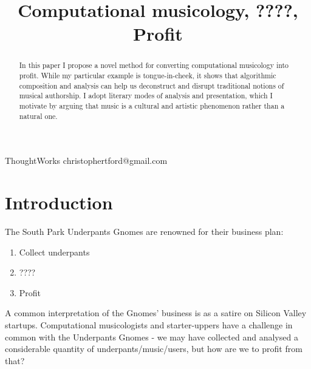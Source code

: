 \documentclass[numbers]{sigplanconf}
\begin{document}
\setlength{\pdfpageheight}{\paperheight}
\setlength{\pdfpagewidth}{\paperwidth}




\title{Computational musicology, ????, Profit}

           {ThoughtWorks}
           {christophertford@gmail.com}

\maketitle

\begin{abstract}
In this paper I propose a novel method for converting computational musicology into profit. While my particular example
is tongue-in-cheek, it shows that algorithmic composition and analysis can help us deconstruct and disrupt
traditional notions of musical authorship. I adopt literary modes of analysis and presentation, which I motivate by
arguing that music is a cultural and artistic phenomenon rather than a natural one.
\end{abstract}



\section{Introduction}

The South Park Underpants Gnomes\cite{Gnomes} are renowned for their business plan:
\begin{enumerate}
    \item Collect underpants
    \item ????
    \item Profit
\end{enumerate}

A common interpretation of the Gnomes' business is as a satire on Silicon Valley startups.
Computational musicologists and starter-uppers have a challenge in common with the Underpants Gnomes
- we may have collected and analysed a considerable quantity of underpants/music/users, but how are we to profit from that?
\end{document}
